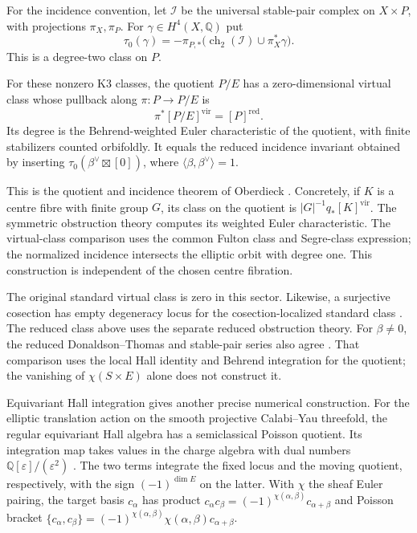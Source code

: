 For the incidence convention, let $\mathcal I$ be the
universal stable-pair complex on $X\times P$, with
projections $\pi_X,\pi_P$. For $\gamma\in H^4(X,\mathbb Q)$
put
\[
 \tau_0(\gamma)=-\pi_{P,*}
       \bigl(\operatorname{ch}_2(\mathcal I)\cup\pi_X^*\gamma\bigr).
\]
This is a degree-two class on $P$.

\begin{theorem}
\label{cycompact:thm:reduced-pairs}
For these nonzero K3 classes, the quotient
$P/E$ has a zero-dimensional virtual class
whose pullback along $\pi:P\to P/E$ is
\begin{equation}\label{cycompact:eq:virtual-comparison}
 \pi^*[P/E]^{\mathrm{vir}}=[P]^{\mathrm{red}}.
\end{equation}
Its degree is the Behrend-weighted Euler
characteristic of the quotient, with finite
stabilizers counted orbifoldly. It equals
the reduced incidence invariant obtained by
inserting $\tau_0(\beta^\vee\boxtimes[0])$,
where $\langle\beta,\beta^\vee\rangle=1$.
\end{theorem}

This is the quotient and incidence theorem
of Oberdieck \cite[Theorems 1--2]{cycompact:Oberdieck}.
Concretely, if $K$ is a centre fibre with
finite group $G$, its class on the quotient
is $|G|^{-1}q_*[K]^{\mathrm{vir}}$.
The symmetric obstruction theory computes
its weighted Euler characteristic. The
virtual-class comparison uses the common
Fulton class and Segre-class expression;
the normalized incidence intersects the
elliptic orbit with degree one. This
construction is independent of the chosen
centre fibration.

The original standard virtual class is zero
in this sector. Likewise, a surjective
cosection has empty degeneracy locus for
the cosection-localized standard class
\cite[Theorem 1.1]{cycompact:KiemLi}.
The reduced class above uses the
separate reduced obstruction theory.
For $\beta\ne0$, the reduced Donaldson--Thomas
and stable-pair series also agree
\cite[Theorem 3(i)]{cycompact:Oberdieck}.
That comparison uses the local Hall identity
and Behrend integration for the quotient;
the vanishing of $\chi(S\times E)$ alone
does not construct it.

Equivariant Hall integration gives another
precise numerical construction. For the
elliptic translation action on the smooth
projective Calabi--Yau threefold, the
regular equivariant Hall algebra has a
semiclassical Poisson quotient. Its
integration map takes values in the
charge algebra with dual numbers
$\mathbb Q[\varepsilon]/(\varepsilon^2)$
\cite[Theorem 5]{OberdieckShen}.
The two terms integrate the fixed locus
and the moving quotient, respectively,
with the sign $(-1)^{\dim E}$ on the
latter. With $\chi$ the sheaf Euler pairing,
the target basis $c_\alpha$ has
product
$c_\alpha c_\beta=(-1)^{\chi(\alpha,\beta)}c_{\alpha+\beta}$
and Poisson bracket
$\{c_\alpha,c_\beta\}=(-1)^{\chi(\alpha,\beta)}
\chi(\alpha,\beta)c_{\alpha+\beta}$.

